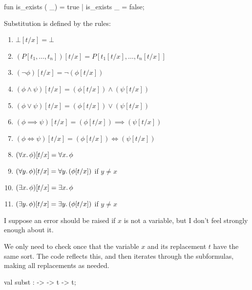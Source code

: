 fun is_exists ( _) = true
  | is_exists _ = false;
\nwendcode{}\nwdocspar

\begin{node}
Substitution is defined by the rules:
\begin{enumerate}
\item $\bot[t/x]=\bot$
\item $(P[t_{1},\dots,t_{n}])[t/x] = P[t_{1}[t/x], \dots, t_{n}[t/x]]$
\item $(\neg\phi)[t/x]=\neg(\phi[t/x])$
\item $(\phi\land\psi)[t/x]=(\phi[t/x])\land(\psi[t/x])$
\item $(\phi\lor\psi)[t/x]=(\phi[t/x])\lor(\psi[t/x])$
\item $(\phi\implies\psi)[t/x]=(\phi[t/x])\implies(\psi[t/x])$
\item $(\phi\iff\psi)[t/x]=(\phi[t/x])\iff(\psi[t/x])$
\item $(\forall x\ldotp\phi)[t/x]=\forall x\ldotp\phi$
\item $(\forall y\ldotp\phi)[t/x]=\forall y\ldotp(\phi[t/x])$ if
  $y\neq x$
\item $(\exists x\ldotp\phi)[t/x]=\exists x\ldotp\phi$
\item $(\exists y\ldotp\phi)[t/x]=\exists y\ldotp(\phi[t/x])$ if
  $y\neq x$
\end{enumerate}
I suppose an error should be raised if $x$ is not a variable, but I
don't feel strongly enough about it.

We only need to check once that the variable $x$ and its replacement
$t$ have the same sort. The code reflects this, and then iterates
through the subformulas, making all replacements as needed.
\end{node}

\nwenddocs{}\plusendmoddef\nwstartdeflinemarkup{}\nwenddeflinemarkup
val subst :  ->  -> t -> t;
\nwendcode{}\nwdocspar

